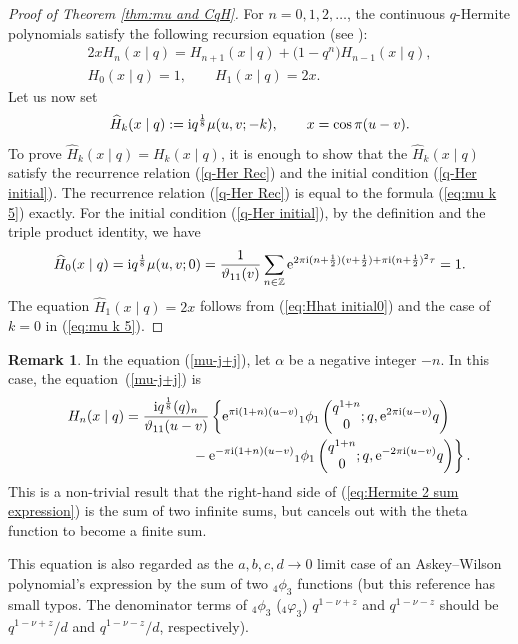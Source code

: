 \documentclass[pdftex]{sigma}
\numberwithin{equation}{section}
\theoremstyle{definition}
\newtheorem{rmk}[thm]{Remark}
\newcommand{\Zz}{\mathbb{Z}}
\newcommand{\hyper}[4]{\left(\begin{matrix} #1 \\ #2 \end{matrix}; #3, #4\right)}
\begin{document}
\begin{proof}[Proof of Theorem \ref{thm:mu and CqH}]
For $n=0,1,2,\dots$, the continuous $q$-Hermite polynomials satisfy the following recursion equation (see \cite[p.~541, equation~(14.26.3)]{KLS}):
\begin{gather}\label{q-Her Rec}
2xH_n(x\mid q)=H_{n+1}(x\mid q)+\big(1-q^n\big)H_{n-1}(x\mid q), \\
\label{q-Her initial}
H_{0}(x\mid q)=1, \qquad H_1(x\mid q)=2x.
\end{gather}
Let us now set
\[
\widehat{H}_{k}(x\mid q):={\rm i}q^\frac{1}{8}\mu(u,v;-k), \qquad x=\cos\pi(u-v).
\]
To prove $\widehat{H}_{k}(x\mid q)={H}_{k}(x\mid q)$, it is enough to show that the $\widehat{H}_{k}(x\mid q)$ satisfy the recurrence relation (\ref{q-Her Rec}) and the initial condition (\ref{q-Her initial}).
The recurrence relation (\ref{q-Her Rec}) is equal to the formula (\ref{eq:mu k 5}) exactly.
For the initial condition (\ref{q-Her initial}), by the definition and the triple product identity, we have
\begin{gather}\label{eq:Hhat initial0}
\widehat{H}_{0}(x\mid q)
 =
 {\rm i}q^\frac{1}{8}\mu(u,v;0)
 =
 \frac{1}{\vartheta_{11}(v)}
 \sum_{n\in\Zz}{\rm e}^{2\pi{\rm i}(n+\frac{1}{2})(v+\frac{1}{2})+\pi{\rm i}(n+\frac{1}{2})^{2}\tau }
 =
 1.
\end{gather}
The equation $\widehat{H}_{1}(x\mid q)=2x$ follows from (\ref{eq:Hhat initial0}) and the case of $k=0$ in (\ref{eq:mu k 5}).
\end{proof}

\begin{rmk}
In the equation (\ref{mu-j+j}), let $\alpha$ be a negative integer $-n$.
In this case, the equation~(\ref{mu-j+j}) is
\begin{gather}
H_n(x\mid q)=\frac{{\rm i}q^\frac{1}{8}(q)_n}{\vartheta_{11}(u-v)}\left\{{\rm e}^{\pi{\rm i}(1+n)(u-v)}{}_1\phi_1\hyper{q^{1+n}}{0}{q}{{\rm e}^{2\pi{\rm i}(u-v)}q}\right.\nonumber\\
\label{eq:Hermite 2 sum expression}
\left.
\hphantom{H_n(x\mid q)=\frac{{\rm i}q^\frac{1}{8}(q)_n}{\vartheta_{11}(u-v)}}{}
-{\rm e}^{-\pi{\rm i}(1+n)(u-v)}{}_1\phi_1\hyper{q^{1+n}}{0}{q}{{\rm e}^{-2\pi{\rm i}(u-v)}q}\right\}.
\end{gather}
This is a non-trivial result that the right-hand side of (\ref{eq:Hermite 2 sum expression}) is the sum of two infinite sums, but cancels out with the theta function to become a finite sum.

This equation is also regarded as the $a,b,c,d \to 0$ limit case of an Askey--Wilson polynomial's expression by the sum of two ${}_4\phi_3$ functions \cite[(2.11)]{S} (but this reference has small typos. The denominator terms of ${}_4\phi_3$ (${}_4\varphi_3$) $q^{1-\nu+z}$ and $q^{1-\nu-z}$ should be $q^{1-\nu+z}/d$ and $q^{1-\nu-z}/d$, respectively).
\end{rmk}
\end{document}
